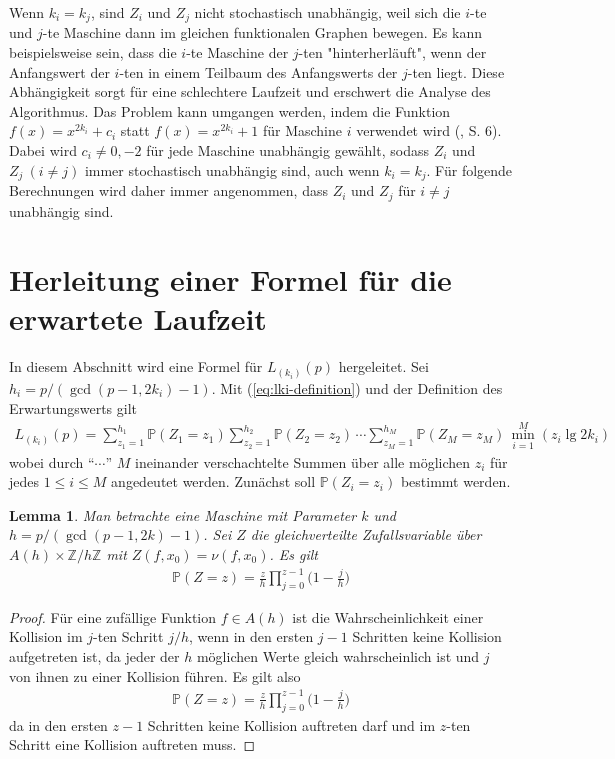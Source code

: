 \documentclass[a4paper, 11pt, ngerman]{article}
\newcommand{\Z}{\mathbb{Z}}
\renewcommand{\P}{\mathbb{P}}
\theoremstyle{definition}
\theoremstyle{plain}
\newtheorem{lemma}{Lemma}
\theoremstyle{remark}
\begin{document}
Wenn $k_i = k_j$, sind $Z_i$ und $Z_j$ nicht stochastisch unabhängig, weil sich die $i$-te und $j$-te Maschine dann im gleichen funktionalen Graphen bewegen. Es kann beispielsweise sein, dass die $i$-te Maschine der $j$-ten "hinterherläuft", wenn der Anfangswert der $i$-ten in einem Teilbaum des Anfangswerts der $j$-ten liegt. Diese Abhängigkeit sorgt für eine schlechtere Laufzeit und erschwert die Analyse des Algorithmus. Das Problem kann umgangen werden, indem die Funktion $f(x) = x^{2k_i} + c_i$ statt $f(x) = x^{2k_i} + 1$ für Maschine $i$ verwendet wird (\cite{cr99}, S. 6). Dabei wird $c_i \ne 0, -2$ für jede Maschine unabhängig gewählt, sodass $Z_i$ und $Z_j \ (i \ne j)$ immer stochastisch unabhängig sind, auch wenn $k_i = k_j$. Für folgende Berechnungen wird daher immer angenommen, dass $Z_i$ und $Z_j$ für $i \ne j$ unabhängig sind.

\section{Herleitung einer Formel für die erwartete Laufzeit}
\label{sec:formula-running-time}

In diesem Abschnitt wird eine Formel für $L_{(k_i)}(p)$ hergeleitet. Sei $h_i = p/(\gcd(p - 1, 2k_i) - 1)$. Mit (\ref{eq:lki-definition}) und der Definition des Erwartungswerts gilt
\begin{align}
    L_{(k_i)}(p) =
    \sum_{z_1 = 1}^{h_1} \P(Z_1 = z_1)
    \sum_{z_2 = 1}^{h_2} \P(Z_2 = z_2) \, \cdots
    \sum_{z_M = 1}^{h_M} \P(Z_M = z_M)
    \, \min_{i = 1}^M(z_i \lg 2k_i)
    \label{formula:etmin-initial}
\end{align}
wobei durch "`$\cdots$"' $M$ ineinander verschachtelte Summen über alle möglichen $z_i$ für jedes $1 \le i \le M$ angedeutet werden. Zunächst soll $\P(Z_i = z_i)$ bestimmt werden.

\begin{lemma}
    Man betrachte eine Maschine mit Parameter $k$ und $h = p/(\gcd(p - 1, 2k) - 1)$. Sei $Z$ die gleichverteilte Zufallsvariable über $A(h) \times \Z/h\Z$ mit $Z(f, x_0) = \nu(f, x_0)$. Es gilt
    \begin{align*}
        \P(Z = z) = \frac z h \prod_{j = 0}^{z - 1} \bigg (1 - \frac j h \bigg )
    \end{align*}

    \label{lemma:prob-s-z}
\end{lemma}

\begin{proof}
    Für eine zufällige Funktion $f \in A(h)$ ist die Wahrscheinlichkeit einer Kollision im $j$-ten Schritt $j/h$, wenn in den ersten $j - 1$ Schritten keine Kollision aufgetreten ist, da jeder der $h$ möglichen Werte gleich wahrscheinlich ist und $j$ von ihnen zu einer Kollision führen. Es gilt also
    \begin{align*}
        \P(Z = z)
        = \frac z h \prod_{j = 0}^{z - 1} \bigg (1 - \frac j h \bigg )
    \end{align*}
    da in den ersten $z - 1$ Schritten keine Kollision auftreten darf und im $z$-ten Schritt eine Kollision auftreten muss.
\end{proof}
\end{document}
